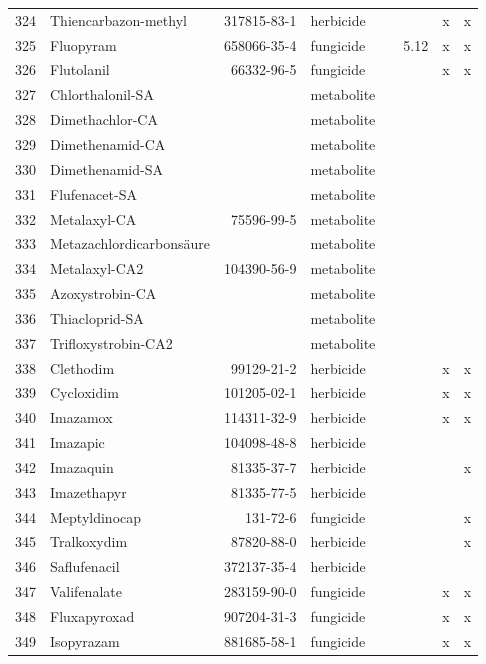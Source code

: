 \begin{longtable}{lp{4cm}rlp{1cm}p{1.5cm}p{1.5cm}p{1cm}}
  324 & Thiencarbazon-methyl & 317815-83-1 & herbicide &  &  & x & x \\ 
  325 & Fluopyram & 658066-35-4 & fungicide &  & 5.12 & x & x \\ 
  326 & Flutolanil & 66332-96-5 & fungicide &  &  & x & x \\ 
  327 & Chlorthalonil-SA &  & metabolite &  &  &  &  \\ 
  328 & Dimethachlor-CA &  & metabolite &  &  &  &  \\ 
  329 & Dimethenamid-CA &  & metabolite &  &  &  &  \\ 
  330 & Dimethenamid-SA &  & metabolite &  &  &  &  \\ 
  331 & Flufenacet-SA &  & metabolite &  &  &  &  \\ 
  332 & Metalaxyl-CA & 75596-99-5 & metabolite &  &  &  &  \\ 
  333 & Metazachlordicarbonsäure &  & metabolite &  &  &  &  \\ 
  334 & Metalaxyl-CA2 & 104390-56-9 & metabolite &  &  &  &  \\ 
  335 & Azoxystrobin-CA &  & metabolite &  &  &  &  \\ 
  336 & Thiacloprid-SA &  & metabolite &  &  &  &  \\ 
  337 & Trifloxystrobin-CA2 &  & metabolite &  &  &  &  \\ 
  338 & Clethodim & 99129-21-2 & herbicide &  &  & x & x \\ 
  339 & Cycloxidim & 101205-02-1 & herbicide &  &  & x & x \\ 
  340 & Imazamox & 114311-32-9 & herbicide &  &  & x & x \\ 
  341 & Imazapic & 104098-48-8 & herbicide &  &  &  &  \\ 
  342 & Imazaquin & 81335-37-7 & herbicide &  &  &  & x \\ 
  343 & Imazethapyr & 81335-77-5 & herbicide &  &  &  &  \\ 
  344 & Meptyldinocap & 131-72-6 & fungicide &  &  &  & x \\ 
  345 & Tralkoxydim & 87820-88-0 & herbicide &  &  &  & x \\ 
  346 & Saflufenacil & 372137-35-4 & herbicide &  &  &  &  \\ 
  347 & Valifenalate & 283159-90-0 & fungicide &  &  & x & x \\ 
  348 & Fluxapyroxad & 907204-31-3 & fungicide &  &  & x & x \\ 
  349 & Isopyrazam & 881685-58-1 & fungicide &  &  & x & x \\ 

\end{longtable}
